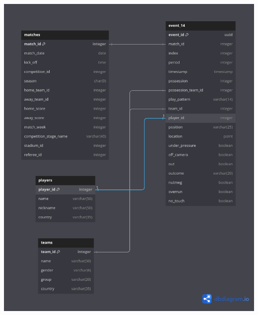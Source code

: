 \documentclass[12pt]{article}
\begin{document}
\includegraphics[width=\textwidth]{schema-diagram/event_14.png}
\end{document}
